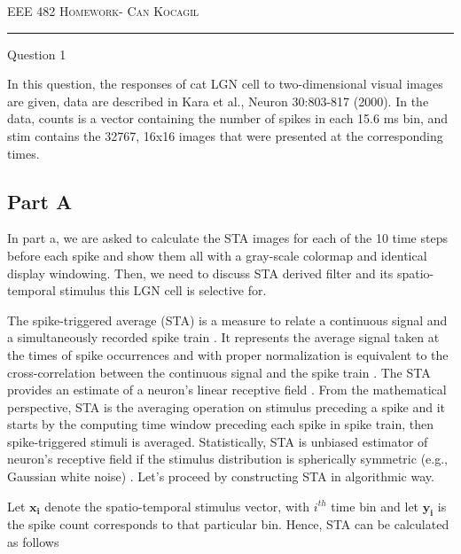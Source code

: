 \documentclass[12pt]{amsart}
\makeatletter
\def\section{\@startsection{section}{1}%
  \z@{.7\linespacing\@plus\linespacing}{.5\linespacing}%
  {\normalfont\scshape}}%
\makeatother
\begin{document}
\newpage


{\scshape EEE 482} \hfill {\scshape \large  Homework-\relax} \hfill {\scshape Can Kocagil}
\smallskip
\hrule



\section{Question 1}

In this question, the responses of cat LGN cell to two-dimensional visual images are given, data are described in Kara et al., Neuron 30:803-817 (2000). In the data, counts is a vector containing the number of spikes in each 15.6 ms bin, and stim contains the 32767,
16x16 images that were presented at the corresponding times.


\subsection{Part A}

In part a, we are asked to calculate the STA images for each of the 10 time steps before each spike and show them all with a gray-scale colormap and identical display windowing. Then, we need to discuss STA derived filter and its spatio-temporal stimulus this LGN cell is selective for.

\bigskip

The spike-triggered average (STA) is a measure to relate a continuous signal and a simultaneously recorded spike train \cite{Ito2015}. It represents the average signal taken at the times of spike occurrences and with proper normalization is equivalent to the cross-correlation between the continuous signal and the spike train \cite{Ito2015}. The STA provides an estimate of a neuron's linear receptive field \cite{enwiki:1000479639}. From the mathematical perspective, STA is the averaging operation on stimulus preceding a spike and it starts by the computing time window preceding each spike in spike train, then spike-triggered stimuli is averaged. Statistically, STA is unbiased estimator of neuron's receptive field if the stimulus distribution is spherically symmetric (e.g., Gaussian white noise) \cite{enwiki:1000479639}. Let's proceed by constructing STA in algorithmic way.

\bigskip

Let $\mathbf{x_i}$ denote the spatio-temporal stimulus vector, with $i^{th}$ time bin and let $\mathbf{y_i}$ is the spike count corresponds to that particular bin. Hence, STA can be calculated as follows
\end{document}
